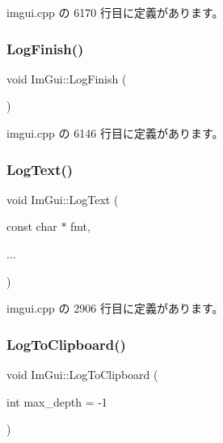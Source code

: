  imgui.\+cpp の 6170 行目に定義があります。

\mbox{\label{namespace_im_gui_a2ebcd048d1ca025fb972e1c2e920e3f3}} 
\subsubsection{\texorpdfstring{Log\+Finish()}{LogFinish()}}
{\footnotesize\ttfamily void Im\+Gui\+::\+Log\+Finish (\begin{DoxyParamCaption}{ }\end{DoxyParamCaption})}



 imgui.\+cpp の 6146 行目に定義があります。

\mbox{\label{namespace_im_gui_aa548475d8f771ab6524d73d900a41198}} 
\subsubsection{\texorpdfstring{Log\+Text()}{LogText()}}
{\footnotesize\ttfamily void Im\+Gui\+::\+Log\+Text (\begin{DoxyParamCaption}\item[{const char $\ast$}]{fmt,  }\item[{}]{... }\end{DoxyParamCaption})}



 imgui.\+cpp の 2906 行目に定義があります。

\mbox{\label{namespace_im_gui_a81add991d176834b8a6e315dfc78e4f7}} 
\subsubsection{\texorpdfstring{Log\+To\+Clipboard()}{LogToClipboard()}}
{\footnotesize\ttfamily void Im\+Gui\+::\+Log\+To\+Clipboard (\begin{DoxyParamCaption}\item[{int}]{max\+\_\+depth = {\ttfamily -\/1} }\end{DoxyParamCaption})}



